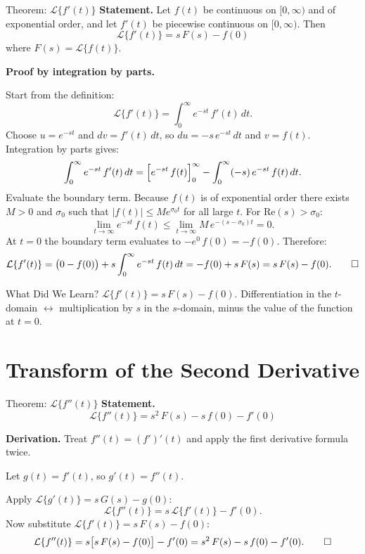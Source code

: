 \documentclass[12pt,a4paper]{article}
\begin{document}
\begin{infobox}{Theorem: $\mathcal{L}\{f'(t)\}$}
\textbf{Statement.} Let $f(t)$ be continuous on $[0,\infty)$ and of
exponential order, and let $f'(t)$ be piecewise continuous on
$[0,\infty)$. Then
\[
  \boxed{\mathcal{L}\{f'(t)\} = s\,F(s) - f(0)}
\]
where $F(s) = \mathcal{L}\{f(t)\}$.

\medskip
\textbf{Proof by integration by parts.}

Start from the definition:
\[
  \mathcal{L}\{f'(t)\} = \int_0^\infty e^{-st}\,f'(t)\,dt.
\]
Choose $u = e^{-st}$ and $dv = f'(t)\,dt$, so $du = -s\,e^{-st}\,dt$
and $v = f(t)$. Integration by parts gives:
\[
  \int_0^\infty e^{-st}\,f'(t)\,dt
  = \Bigl[e^{-st}\,f(t)\Bigr]_0^\infty
    - \int_0^\infty (-s)\,e^{-st}\,f(t)\,dt.
\]
Evaluate the boundary term. Because $f(t)$ is of exponential order there
exists $M>0$ and $\sigma_0$ such that $|f(t)| \le M e^{\sigma_0 t}$ for
all large $t$. For $\text{Re}(s) > \sigma_0$:
\[
  \lim_{t\to\infty} e^{-st}\,f(t)
  \le \lim_{t\to\infty} M\,e^{-(s-\sigma_0)t} = 0.
\]
At $t=0$ the boundary term evaluates to $-e^{0}\,f(0) = -f(0)$.
Therefore:
\[
  \mathcal{L}\{f'(t)\}
  = \bigl(0 - f(0)\bigr) + s\int_0^\infty e^{-st}\,f(t)\,dt
  = -f(0) + s\,F(s)
  = s\,F(s) - f(0). \qed
\]
\end{infobox}

\begin{learnbox}{What Did We Learn?}
$\mathcal{L}\{f'(t)\} = s\,F(s) - f(0)$. Differentiation in the
$t$-domain $\longleftrightarrow$ multiplication by $s$ in the $s$-domain,
minus the value of the function at $t=0$.
\end{learnbox}

\section{Transform of the Second Derivative}

\begin{infobox}{Theorem: $\mathcal{L}\{f''(t)\}$}
\textbf{Statement.}
\[
  \boxed{\mathcal{L}\{f''(t)\} = s^2\,F(s) - s\,f(0) - f'(0)}
\]

\textbf{Derivation.} Treat $f''(t) = (f')'(t)$ and apply the first
derivative formula twice.

Let $g(t) = f'(t)$, so $g'(t) = f''(t)$.

Apply $\mathcal{L}\{g'(t)\} = s\,G(s) - g(0)$:
\[
  \mathcal{L}\{f''(t)\}
  = s\,\mathcal{L}\{f'(t)\} - f'(0).
\]
Now substitute $\mathcal{L}\{f'(t)\} = s\,F(s) - f(0)$:
\[
  \mathcal{L}\{f''(t)\}
  = s\bigl[s\,F(s) - f(0)\bigr] - f'(0)
  = s^2\,F(s) - s\,f(0) - f'(0). \qed
\]
\end{infobox}
\end{document}
